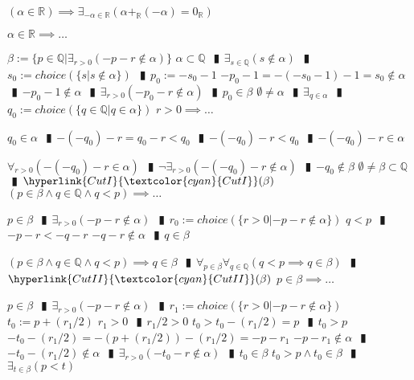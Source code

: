 \documentclass{book}
\newcommand{\wff}[1]{\hypertarget{#1}{\fbox{\textcolor{red}{$#1$}}\phantom{--}}}
\newcommand{\rf}[1]{\hyperlink{#1}{\textcolor{cyan}{#1}}}
\newcommand{\abr}{:=}
\newcommand{\pipe}{$\phantom{(}\vrectangleblack\phantom{)}$}
\newcommand{\pr}[1]{\left(#1\right)}
\begin{document}
\wff{FieldAdditionInverseOfR} $(\alpha \in \mathbb{R}) \implies \exists_{-\alpha \in \mathbb{R}}\pr{\alpha +_{\mathbb{R}} (-\alpha) = 0_{\mathbb{R}}}$
\begin{enumerate}
  \lit $\alpha \in \mathbb{R} \implies \ldots$
  \begin{enumerate}
    \lit $\beta \abr \{p \in \mathbb{Q} | \exists_{r > 0}(-p - r \notin \alpha)\}$
    \lit $\alpha \subset \mathbb{Q}$ \pipe $\exists_{s \in \mathbb{Q}}(s \notin \alpha)$ \pipe $s_0 \abr choice(\{s | s \notin \alpha\})$ \pipe $p_0 \abr -s_0 - 1$
    \lit $-p_0 - 1 = -(-s_0 - 1) - 1 = s_0 \notin \alpha$ \pipe $-p_0 - 1 \notin \alpha$ \pipe $\exists_{r > 0}(-p_0 - r \notin \alpha)$ \pipe $p_0 \in \beta$
    \lit $\emptyset \neq \alpha$ \pipe $\exists_{q \in \alpha}$ \pipe $q_0 \abr choice(\{q \in \mathbb{Q} | q \in \alpha\})$
    \lit $r > 0 \implies \ldots$
    \begin{enumerate}
      \lit $q_0 \in \alpha$ \pipe $-(-q_0) - r = q_0 - r < q_0$ \pipe $-(-q_0) - r < q_0$ \pipe $-(-q_0) - r \in \alpha$
    \end{enumerate}
    \lit $\forall_{r > 0}\pr{-(-q_0) - r \in \alpha}$ \pipe $\lnot \exists_{r > 0}(-(-q_0) -r \notin \alpha)$ \pipe $-q_0 \notin \beta$
    \lit $\emptyset \neq \beta \subset \mathbb{Q}$ \pipe $\rf{CutI}(\beta)$
    \lit $(p \in \beta \land q \in \mathbb{Q} \land q < p) \implies \ldots$
    \begin{enumerate}
      \lit $p \in \beta$ \pipe $\exists_{r > 0}(-p - r \notin \alpha)$ \pipe $r_0 \abr choice(\{r > 0 | -p - r \notin \alpha\})$
      \lit $q < p$ \pipe $-p - r < -q - r$
      \lit $-q -r \notin \alpha$ \pipe $q \in \beta$
    \end{enumerate}
    \lit $(p \in \beta \land q \in \mathbb{Q} \land q < p) \implies q \in \beta$ \pipe $\forall_{p \in \beta} \forall_{q \in \mathbb{Q}}(q < p \implies q \in \beta)$ \pipe $\rf{CutII}(\beta)$
    \lit $p \in \beta \implies \ldots$
    \begin{enumerate}
      \lit $p \in \beta$ \pipe $\exists_{r > 0}(-p - r \notin \alpha)$ \pipe $r_1 \abr choice(\{r > 0 | -p - r \notin \alpha\})$
      \lit $t_0 \abr p + (r_1 / 2)$
      \lit $r_1 > 0$ \pipe $r_1 / 2 > 0$
      \lit $t_0 > t_0 - (r_1 / 2) = p$ \pipe $t_0 > p$
      \lit $-t_0 - (r_1 / 2) = -(p + (r_1 / 2)) - (r_1 / 2) = -p - r_1$
      \lit $-p - r_1 \notin \alpha$ \pipe $-t_0 - (r_1 / 2) \notin \alpha$ \pipe $\exists_{r > 0}(-t_0 - r \notin \alpha)$ \pipe $t_0 \in \beta$
      \lit $t_0 > p \land t_0 \in \beta$ \pipe $\exists_{t \in \beta}(p < t)$

\end{enumerate}
\end{enumerate}
\end{enumerate}
\end{document}

